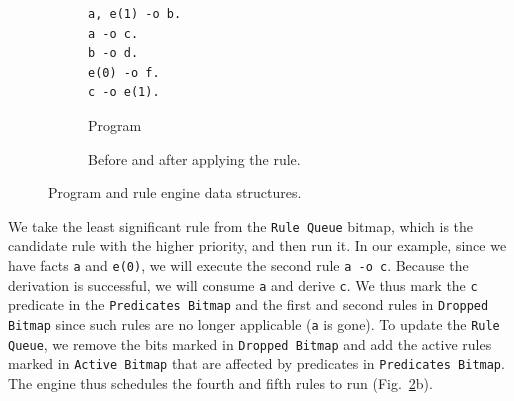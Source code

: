 \begin{figure}[h]
   \vspace{-\intextsep}
   \centering
   \begin{subfigure}[b]{0.2\textwidth}
      \centering
      {\footnotesize\begin{Verbatim}
a, e(1) -o b.
a -o c.
b -o d.
e(0) -o f.
c -o e(1).
      \end{Verbatim}
      }
      \begin{minipage}{.3cm}
                  \vfill
                  \end{minipage}
      \caption{Program}
      \label{code:5rules}
   \end{subfigure}
   \begin{subfigure}[b]{0.7\textwidth}
      \caption{Before and after applying the  rule.}
   \end{subfigure}
   \caption{Program and rule engine data structures.}
   \label{fig:rule_engine}
   \vspace{-0.8\intextsep}
\end{figure}

We take the least significant rule from the \texttt{Rule Queue} bitmap, which is the candidate rule with the higher priority, and then run it. In our example, since we have facts \texttt{a} and \texttt{e(0)},
we will execute the second rule \texttt{a -o c}.
Because the derivation is successful, we will consume \texttt{a} and derive \texttt{c}.
We thus mark the \texttt{c} predicate in the \texttt{Predicates Bitmap} and the first and second rules
in \texttt{Dropped Bitmap} since such rules are no longer applicable (\texttt{a} is gone). To update the \texttt{Rule Queue},
we remove the bits marked in \texttt{Dropped Bitmap} and add the active rules marked in \texttt{Active Bitmap} that are affected
by predicates in \texttt{Predicates Bitmap}. The engine thus schedules the fourth and fifth rules to run (Fig.~\ref{fig:rule_engine}b).

